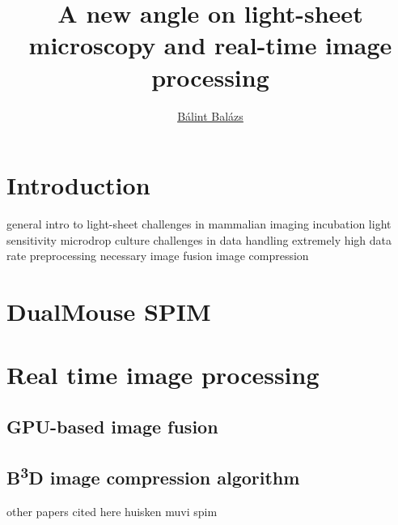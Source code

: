 \documentclass{booklet_style}
\author{\href{mailto:balint.balazs@embl.de}{Bálint Balázs}}
\title{A new angle on light-sheet microscopy and real-time image processing}
\def\b3d{B\textsuperscript{3}D}
\begin{document}
\maketitle

\newpage
\setcounter{page}{1}
\section{Introduction}
general intro to light-sheet
challenges in mammalian imaging
    incubation
    light sensitivity
    microdrop culture
challenges in data handling
    extremely high data rate
    preprocessing necessary
        image fusion
        image compression
    

\section{DualMouse SPIM}


\section{Real time image processing}

\subsection*{GPU-based image fusion}

\subsection*{\b3d image compression algorithm}



other papers cited here
huisken \cite{huisken_optical_2004}
muvi spim \cite{krzic_multiview_2012}









\end{document}
